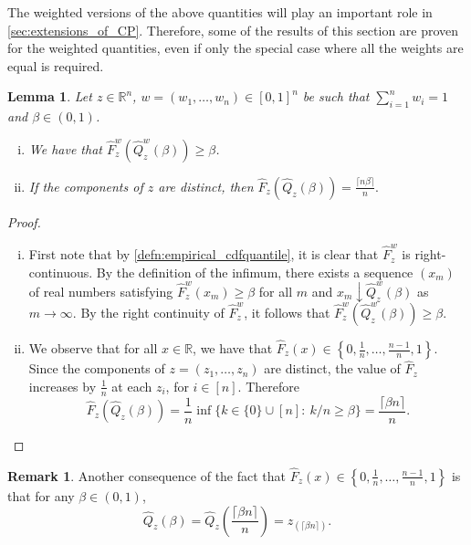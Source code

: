 \documentclass[11pt, titlepage]{article} %
\numberwithin{equation}{section}
\newtheorem{lemma}{Lemma}
\theoremstyle{definition}
\newtheorem{remark}{Remark}
\numberwithin{theorem}{section}
\numberwithin{lemma}{section}
\numberwithin{corollary}{section}
\numberwithin{proposition}{section}
\numberwithin{definition}{section}
\numberwithin{remark}{section}
\begin{document}
\noindent
The weighted versions of the above quantities will play an important role in \cref{sec:extensions_of_CP}. Therefore, some of the results of this section are proven for the weighted quantities, even if only the special case where all the weights are equal is required.

\begin{lemma} Let \(z \in \mathbb{R}^n\), \(w = (w_1, \ldots, w_n) \in [0,1]^n\) be such that \(\sum_{i=1}^n w_i = 1\) and \(\beta \in (0,1)\).
    \begin{enumerate}[(i)] \itemsep0em
        \item We have that \(\hat{F}^w_z\left(\hat{Q}^w_z(\beta) \right) \geq \beta\).
        \item If the components of \(z\) are distinct, then \(\hat{F}_z\left(\hat{Q}_z(\beta)\right) = \frac{\lceil{n\beta}\rceil}{n}.\)
    \end{enumerate} 
\label{lemma:cdfquantile}
\end{lemma}
\begin{proof}

    \begin{enumerate}[(i)] \itemsep0em
        \item First note that by \cref{defn:empirical_cdfquantile}, it is clear that \(\hat{F}^w_z\) is right-continuous. By the definition of the infimum, there exists a sequence \((x_m)\) of real numbers satisfying \(\hat{F}^w_z(x_m) \geq \beta\) for all \(m\) and \(x_m \downarrow \hat{Q}^w_z(\beta)\) as \(m \to \infty\). By the right continuity of \(\hat{F}^w_z\), it follows that \(\hat{F}^w_z\left(\hat{Q}^w_z(\beta) \right) \geq \beta\).
        \item We observe that for all \(x \in \mathbb{R}\), we have that \(\hat{F}_z(x) \in \left\{0, \frac{1}{n}, \ldots, \frac{n-1}{n}, 1\right\}\). Since the components of \(z = (z_1, \ldots, z_n)\) are distinct, the value of \(\hat{F}_z\) increases by \(\frac{1}{n}\) at each \(z_i\), for \(i \in [n]\). Therefore \[\hat{F}_z\left(\hat{Q}_z(\beta)\right) = \frac{1}{n} \inf \{k \in \{0\} \cup [n]: \ k/n \geq \beta \} = \frac{\lceil{\beta n}\rceil}{n}.\]
    \end{enumerate}
\end{proof}

\begin{remark}
    Another consequence of the fact that \(\hat{F}_z(x) \in \left\{0, \frac{1}{n}, \ldots, \frac{n-1}{n}, 1\right\}\) is that for any \(\beta \in (0,1)\), \[\hat{Q}_z(\beta) = \hat{Q}_z\left( \frac{\lceil \beta n \rceil}{n} \right) = z_{(\lceil \beta n \rceil)}.\]
\label{rmk:order_stat_quantile}
\end{remark}
\end{document}
